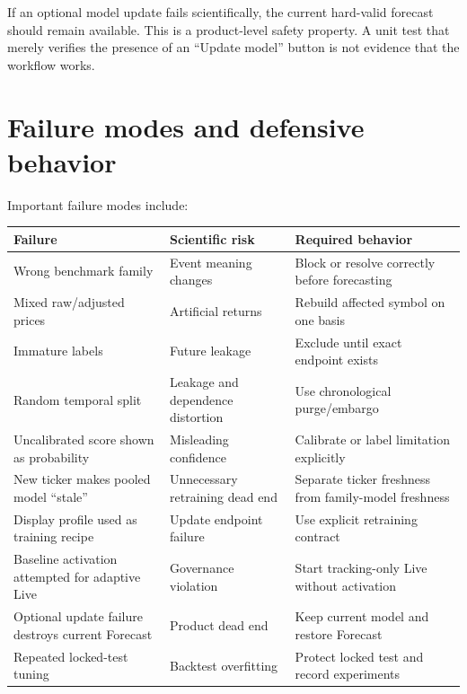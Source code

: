 \documentclass[11pt]{article}
\begin{document}
If an optional model update fails scientifically, the current hard-valid forecast should remain available. This is a product-level safety property. A unit test that merely verifies the presence of an ``Update model'' button is not evidence that the workflow works.

\section{Failure modes and defensive behavior}
Important failure modes include:
\begin{longtable}{p{}p{}p{}}
\toprule
Failure & Scientific risk & Required behavior\\
\midrule
\endhead
Wrong benchmark family & Event meaning changes & Block or resolve correctly before forecasting\\
Mixed raw/adjusted prices & Artificial returns & Rebuild affected symbol on one basis\\
Immature labels & Future leakage & Exclude until exact endpoint exists\\
Random temporal split & Leakage and dependence distortion & Use chronological purge/embargo\\
Uncalibrated score shown as probability & Misleading confidence & Calibrate or label limitation explicitly\\
New ticker makes pooled model ``stale'' & Unnecessary retraining dead end & Separate ticker freshness from family-model freshness\\
Display profile used as training recipe & Update endpoint failure & Use explicit retraining contract\\
Baseline activation attempted for adaptive Live & Governance violation & Start tracking-only Live without activation\\
Optional update failure destroys current Forecast & Product dead end & Keep current model and restore Forecast\\
Repeated locked-test tuning & Backtest overfitting & Protect locked test and record experiments\\
\bottomrule
\end{longtable}
\end{document}
